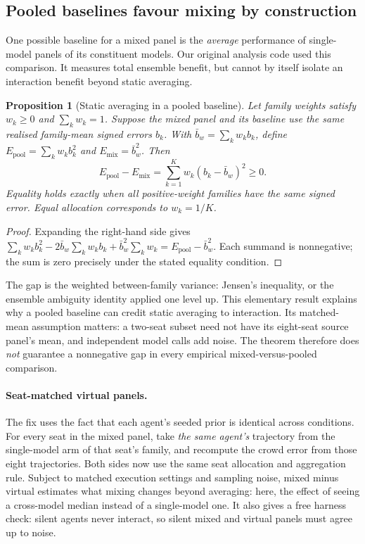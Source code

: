 \documentclass[10pt]{article}
\theoremstyle{manuscript}\newtheorem{proposition}{Proposition}
\begin{document}
\subsection{Pooled baselines favour mixing by construction}\label{sec:pooled}

One possible baseline for a mixed panel is the \emph{average} performance of single-model panels of its constituent models. Our original analysis code used this comparison. It measures total ensemble benefit, but cannot by itself isolate an interaction benefit beyond static averaging.

\begin{proposition}[Static averaging in a pooled baseline]\label{prop:jensen}
Let family weights satisfy $w_k\ge0$ and $\sum_k w_k=1$. Suppose the mixed panel and its baseline use the \emph{same realised family-mean signed errors} $b_k$. With $\bar b_w=\sum_k w_kb_k$, define $E_{\mathrm{pool}}=\sum_k w_kb_k^2$ and $E_{\mathrm{mix}}=\bar b_w^2$. Then
\begin{equation}\label{eq:jensen}
E_{\mathrm{pool}}-E_{\mathrm{mix}}
=\sum_{k=1}^K w_k(b_k-\bar b_w)^2\ge0.
\end{equation}
Equality holds exactly when all positive-weight families have the same signed error. Equal allocation corresponds to $w_k=1/K$.
\end{proposition}
\begin{proof}
Expanding the right-hand side gives $\sum_k w_kb_k^2-2\bar b_w\sum_k w_kb_k+\bar b_w^2\sum_k w_k=E_{\mathrm{pool}}-\bar b_w^2$. Each summand is nonnegative; the sum is zero precisely under the stated equality condition.
\end{proof}
\noindent The gap is the weighted between-family variance: Jensen's inequality, or the ensemble ambiguity identity applied one level up. This elementary result explains why a pooled baseline can credit static averaging to interaction. Its matched-mean assumption matters: a two-seat subset need not have its eight-seat source panel's mean, and independent model calls add noise. The theorem therefore does \emph{not} guarantee a nonnegative gap in every empirical mixed-versus-pooled comparison.

\paragraph{Seat-matched virtual panels.} The fix uses the fact that each agent's seeded prior is identical across conditions. For every seat in the mixed panel, take \emph{the same agent's} trajectory from the single-model arm of that seat's family, and recompute the crowd error from those eight trajectories. Both sides now use the same seat allocation and aggregation rule. Subject to matched execution settings and sampling noise, mixed minus virtual estimates what mixing changes beyond averaging: here, the effect of seeing a cross-model median instead of a single-model one. It also gives a free harness check: silent agents never interact, so silent mixed and virtual panels must agree up to noise.
\end{document}
